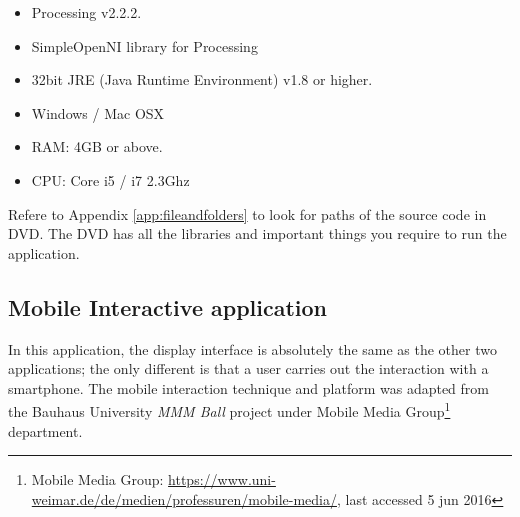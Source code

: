 \begin{itemize}
\item Processing v2.2.2.
\item SimpleOpenNI library for Processing \cite{simpleopenni}
\item 32bit JRE (Java Runtime Environment) v1.8 or higher.
\item Windows / Mac OSX
\item RAM: 4GB or above.
\item CPU: Core i5 / i7 2.3Ghz
\end{itemize}

Refere to Appendix \ref{app:fileandfolders} to look for paths of the source code in DVD. The DVD has all the libraries and important things you require to run the application.

\fi

\subsection{Mobile Interactive application}
In this application, the display interface is absolutely the same as the other two applications; the only different is that a user carries out the interaction with a smartphone. The mobile interaction technique and platform was adapted from the Bauhaus University \emph{MMM Ball}\cite{MMMball, MMMball2} project under Mobile Media Group\footnote{Mobile Media Group: \url{https://www.uni-weimar.de/de/medien/professuren/mobile-media/}, last accessed 5 jun 2016} department.

